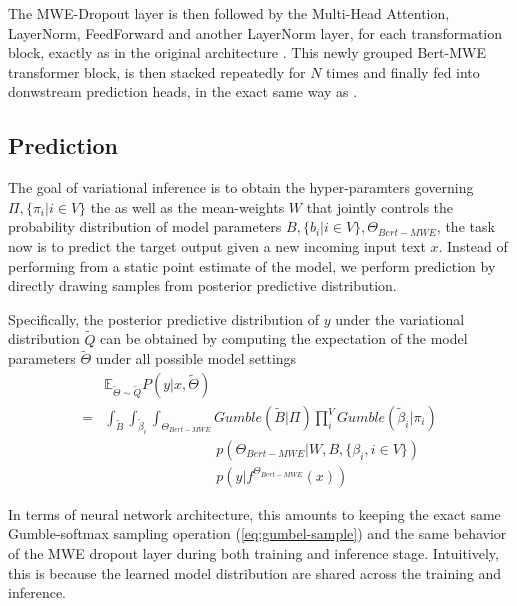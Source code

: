 The MWE-Dropout layer is then followed by the Multi-Head Attention, LayerNorm, FeedForward and another LayerNorm layer, for each transformation block, exactly as in the original architecture \cite{vaswani2017attention}. This newly grouped Bert-MWE transformer block, is then stacked repeatedly for $N$ times and finally fed into donwstream prediction heads, in the exact same way as \cite{devlin2018bert}.


\subsection{Prediction} \label{sec:prediction}
The goal of variational inference is to obtain the hyper-paramters governing $\Pi, \{\pi_i \vert i \in V\}$ the as well as the mean-weights $W$ that jointly controls the probability distribution of model parameters $B, \{b_i \vert i \in V\}, \Theta_{Bert-MWE}$, the task now is to predict the target output given a new incoming input text $x$.
Instead of performing  from a static point estimate of the model, we perform prediction by directly drawing samples from posterior predictive distribution.

Specifically, the posterior predictive distribution of $y$ under the variational distribution $\tilde{Q}$ can be obtained by computing the expectation of the model parameters $\tilde{\Theta}$ under all possible model settings
\begin{align}
& \mathbb{E}_{\tilde{\Theta} \sim \tilde{Q}} P (y | x, \tilde{\Theta}) \nonumber\\ 
= & \int_{\tilde{B}} \int_{\tilde{\beta}_i}\int_{\Theta_{Bert-MWE}} Gumble(\tilde{B} | \Pi) \prod_i^{V} Gumble(\tilde{\beta}_i | \pi_i) \nonumber\\ 
& \quad \quad \quad \quad \quad \quad \quad \quad p(\Theta_{Bert-MWE} \vert W, B, \{\beta_i, i \in V\}) \nonumber\\ 
& \quad \quad \quad \quad \quad \quad \quad \quad p(y \vert f^{\Theta_{Bert-MWE}}(x)) 
\label{eq:prediction}
\end{align}

In terms of neural network architecture, this amounts to keeping the exact same Gumble-softmax sampling operation (\autoref{eq:gumbel-sample}) and the same behavior of the MWE dropout layer during both training and inference stage. Intuitively, this is because the learned model distribution are shared across the training and inference.